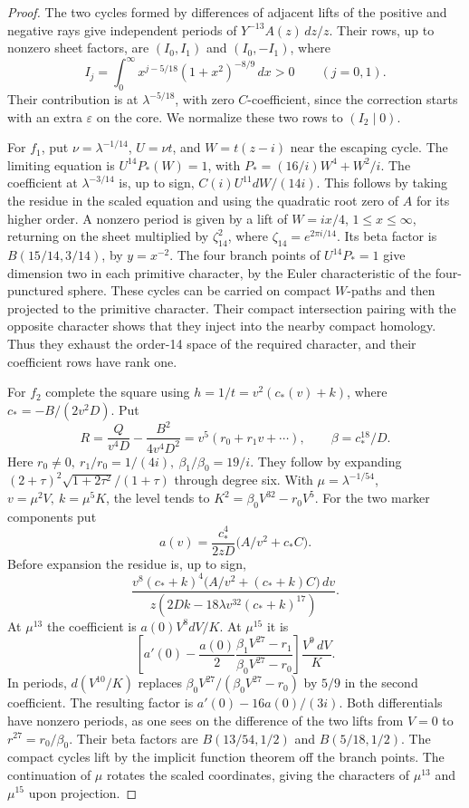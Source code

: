 \documentclass[11pt]{article}
\begin{document}
\begin{proof}
The two cycles formed by differences of adjacent lifts of
the positive and negative rays give independent periods
of \(Y^{-13} A(z)\,dz/z\). Their rows, up to nonzero
sheet factors, are \((I_0,I_1)\) and \((I_0,-I_1)\), where
\[
 I_j=\int_0^\infty x^{j-5/18}(1+x^2)^{-8/9}\,dx>0
       \qquad(j=0,1).
\]
Their contribution is at \(\lambda^{-5/18}\), with zero
\(C\)-coefficient, since the correction starts with an
extra \(\varepsilon\) on the core. We normalize these
two rows to \((I_2\mid0)\).

For \(f_1\), put \(\nu=\lambda^{-1/14}\), \(U=\nu t\),
and \(W=t(z-i)\) near the escaping cycle. The limiting
equation is \(U^{14}P_*(W)=1\), with
\(P_*=(16/i)W^4+W^2/i\). The coefficient at
\(\lambda^{-3/14}\) is, up to sign, \(C(i)U^{11}dW/(14i)\).
This follows by taking the residue in the scaled
equation and using the quadratic root zero of \(A\)
for its higher order. A nonzero period is given by a
lift of \(W=i x/4\), \(1\le x\le\infty\), returning on
the sheet multiplied by \(\zeta_{14}^2\), where
\(\zeta_{14}=e^{2\pi i/14}\). Its beta factor
is \(B(15/14,3/14)\), by \(y=x^{-2}\).
The four branch points of \(U^{14}P_*=1\) give dimension
two in each primitive character, by the Euler
characteristic of the four-punctured sphere.
These cycles can be carried on compact \(W\)-paths and
then projected to the primitive character. Their compact
intersection pairing with the opposite character shows
that they inject into the nearby compact homology.
Thus they exhaust the order-14 space of the required
character, and their coefficient rows have rank one.

For \(f_2\) complete the square using \(h=1/t=v^2(c_*(v)+k)\),
where \(c_*=-B/(2v^2D)\). Put
\[
 R=\frac{Q}{v^4D}-\frac{B^2}{4v^4D^2}
     =v^5(r_0+r_1v+\cdots),\qquad
 \beta=c_*^{18}/D .
\]
Here \(r_0\ne0,\ r_1/r_0=1/(4i),\
\beta_1/\beta_0=19/i\). They follow by expanding
\((2+\tau)^2\sqrt{1+2\tau^2}/(1+\tau)\) through degree six.
With \(\mu=\lambda^{-1/54}\), \(v=\mu^2V,\ k=\mu^5K\),
the level tends to \(K^2=\beta_0V^{32}-r_0 V^5\).
For the two marker components put
\[
 a(v)=\frac{c_*^4}{2zD}\bigl(A/v^2+c_*C\bigr).
\]
Before expansion the residue is, up to sign,
\[
 \frac{v^8(c_*+k)^4\bigl(A/v^2+(c_*+k) C\bigr)\,dv}
      {z(2Dk-18\lambda v^{32}(c_*+k)^{17})}.
\]
At \(\mu^{13}\) the coefficient is \(a(0)V^8dV/K\).
At \(\mu^{15}\) it is
\[
 \left[
 a'(0)-\frac{a(0)}2
   \frac{\beta_1V^{27}-r_1}{\beta_0V^{27}-r_0}
 \right]\frac{V^9\,dV}{K}.
\]
In periods, \(d(V^{10}/K)\) replaces
\(\beta_0V^{27}/(\beta_0V^{27}-r_0)\) by \(5/9\) in the
second coefficient. The resulting factor is
\(a'(0)-16a(0)/(3i)\).
Both differentials have nonzero periods, as one sees on
the difference of the two lifts from \(V=0\) to
\(r^{27}=r_0/\beta_0\). Their beta factors are
\(B(13/54,1/2)\) and \(B(5/18,1/2)\).
The compact cycles lift by the implicit function theorem
off the branch points. The continuation of \(\mu\)
rotates the scaled coordinates, giving the characters
of \(\mu^{13}\) and \(\mu^{15}\) upon projection.


\end{proof}
\end{document}
